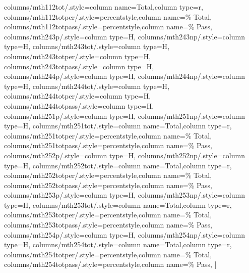 \documentclass[varwidth]{standalone}
\begin{document}
{    columns/mth112tot/.style={column name=Total,column type=r},
    columns/mth112totper/.style={percentstyle,column name=\% Total},
    columns/mth112totpass/.style={percentstyle,column name=\% Pass},
    columns/mth243p/.style={column type=H},
    columns/mth243np/.style={column type=H},
    columns/mth243tot/.style={column type=H},
    columns/mth243totper/.style={column type=H},
    columns/mth243totpass/.style={column type=H},
    columns/mth244p/.style={column type=H},
    columns/mth244np/.style={column type=H},
    columns/mth244tot/.style={column type=H},
    columns/mth244totper/.style={column type=H},
    columns/mth244totpass/.style={column type=H},
    columns/mth251p/.style={column type=H},
    columns/mth251np/.style={column type=H},
    columns/mth251tot/.style={column name=Total,column type=r},
    columns/mth251totper/.style={percentstyle,column name=\% Total},
    columns/mth251totpass/.style={percentstyle,column name=\% Pass},
    columns/mth252p/.style={column type=H},
    columns/mth252np/.style={column type=H},
    columns/mth252tot/.style={column name=Total,column type=r},
    columns/mth252totper/.style={percentstyle,column name=\% Total},
    columns/mth252totpass/.style={percentstyle,column name=\% Pass},
    columns/mth253p/.style={column type=H},
    columns/mth253np/.style={column type=H},
    columns/mth253tot/.style={column name=Total,column type=r},
    columns/mth253totper/.style={percentstyle,column name=\% Total},
    columns/mth253totpass/.style={percentstyle,column name=\% Pass},
    columns/mth254p/.style={column type=H},
    columns/mth254np/.style={column type=H},
    columns/mth254tot/.style={column name=Total,column type=r},
    columns/mth254totper/.style={percentstyle,column name=\% Total},
    columns/mth254totpass/.style={percentstyle,column name=\% Pass},
]{\diversitydata}
}
\end{document}
